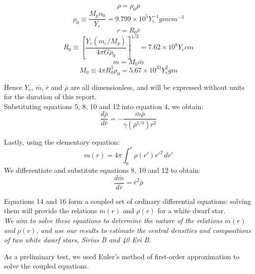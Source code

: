 \documentclass[10pt]{article}
\begin{document}
{\begin{equation} \rho = \rho_0 \bar{\rho} \end{equation}
\begin{equation} \rho_0 \equiv \frac{M_p n_0}{Y_e} = 9.799 \times 10^5 Y_e^{-1} gm cm^{-3} \end{equation}
\begin{equation} r = R_0 \bar{r} \end{equation}
\begin{equation} R_0 \equiv [\frac{Y_e(m_e/M_p)}{4\pi G \rho_0}]^{1/2} = 7.62 \times 10^8 Y_e cm \end{equation}
\begin{equation} m = M_0 \bar{m} \end{equation}
\begin{equation} M_0 \equiv 4 \pi R_0^3 \rho_0 = 5.67 \times 10^{33} Y_e^2 gm \end{equation}

Hence $Y_e$, $\bar{m}$, $\bar{r}$ and $\bar{\rho}$ are all dimensionless, and will be expressed without units for the duration of this report.\\

Substituting equations 5, 8, 10 and 12 into equation 4, we obtain:
\begin{equation} \frac{d\bar{\rho}}{d\bar{r}} = - \frac{\bar{m} \bar{\rho}}{\gamma(\bar{\rho}^{1/3})\bar{r}^2} \end{equation}

Lastly, using the elementary equation:
\begin{equation} m(r) = 4 \pi \int_{0}^{r}\rho(r')r'^2 \,dr' \end{equation}
We differentiate and substitute equations 8, 10 and 12 to obtain:
\begin{equation} \frac{d\bar{m}}{d\bar{r}} = \bar{r}^2 \bar{\rho} \end{equation}

Equations 14 and 16 form a coupled set of ordinary differential equations: solving them will provide the relations $m(r)$ and $\rho(r)$ for a white dwarf star. \\

\em{We aim to solve these equations to determine the nature of the relations $m(r)$ and $\rho(r)$, and use our results to estimate the central densities and compositions of two white dwarf stars, Sirius B and 40 Eri B.} \em

\bigskip


As a preliminary test, we used Euler's method of first-order approximation to solve the coupled equations.\\

}
\end{document}

